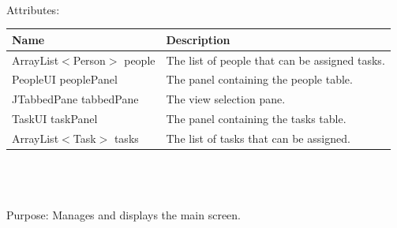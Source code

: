\\
Attributes: \\
\begin{tabular}{| l | l |}
\hline
Name & Description\\
\hline
ArrayList$<$Person$>$ people & The list of people that can be assigned tasks.\\
\hline
PeopleUI peoplePanel & The panel containing the people table.\\
\hline
JTabbedPane tabbedPane & The view selection pane.\\
\hline
TaskUI taskPanel & The panel containing the tasks table.\\
\hline
ArrayList$<$Task$>$ tasks & The list of tasks that can be assigned.\\
\hline
\end{tabular}\\
\\
\\
Purpose: Manages and displays the main screen.\\
\\
\\
